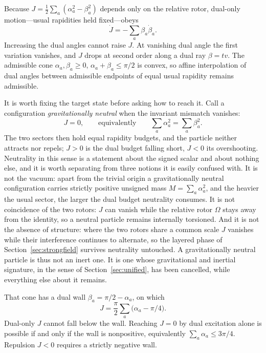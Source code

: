 \documentclass[a4paper]{article}
\begin{document}
Because $J=\tfrac12\sum_a(\alpha_a^2-\beta_a^2)$ depends only on the relative rotor, dual-only motion---usual rapidities held fixed---obeys
\[
\dot J=-\sum_a\beta_a\dot\beta_a.
\]
Increasing the dual angles cannot raise $J$. At vanishing dual angle the first variation vanishes, and $J$ drops at second order along a dual ray $\beta=tv$. The admissible cone $\alpha_a,\beta_a\ge 0$, $\alpha_a+\beta_a\le\pi/2$ is convex, so affine interpolation of dual angles between admissible endpoints of equal usual rapidity remains admissible.

It is worth fixing the target state before asking how to reach it. Call a configuration \emph{gravitationally neutral} when the invariant mismatch vanishes:
\begin{equation}
\label{eq:neutral-def}
J=0,\qquad\text{equivalently}\qquad\sum_a\alpha_a^2=\sum_a\beta_a^2 .
\end{equation}
The two sectors then hold equal rapidity budgets, and the particle neither attracts nor repels; $J>0$ is the dual budget falling short, $J<0$ its overshooting. Neutrality in this sense is a statement about the signed scalar and about nothing else, and it is worth separating from three notions it is easily confused with. It is not the vacuum: apart from the trivial origin a gravitationally neutral configuration carries strictly positive unsigned mass $M=\sum_a\alpha_a^2$, and the heavier the usual sector, the larger the dual budget neutrality consumes. It is not coincidence of the two rotors: $J$ can vanish while the relative rotor $\Omega$ stays away from the identity, so a neutral particle remains internally torsioned. And it is not the absence of structure: where the two rotors share a common scale $J$ vanishes while their interference continues to alternate, so the layered phase of Section~\ref{sec:strongfield} survives neutrality untouched. A gravitationally neutral particle is thus not an inert one. It is one whose gravitational and inertial signature, in the sense of Section~\ref{sec:unified}, has been cancelled, while everything else about it remains.

That cone has a dual wall $\beta_a=\pi/2-\alpha_a$, on which
\[
J=\frac\pi2\sum_a\bigl(\alpha_a-\pi/4\bigr).
\]
Dual-only $J$ cannot fall below the wall. Reaching $J=0$ by dual excitation alone is possible if and only if the wall is nonpositive, equivalently $\sum_a\alpha_a\le 3\pi/4$. Repulsion $J<0$ requires a strictly negative wall.
\end{document}
